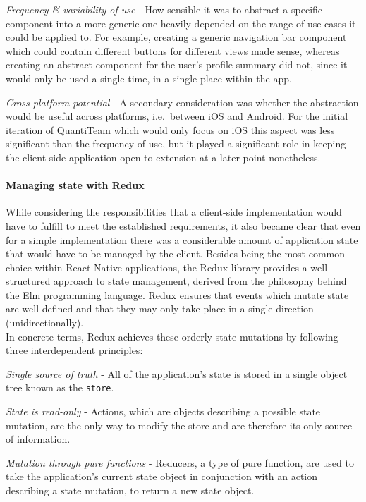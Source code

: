 \emph{Frequency \& variability of use} - How sensible it was to abstract
a specific component into a more generic one heavily depended on the
range of use cases it could be applied to. For example, creating a
generic navigation bar component which could contain different buttons
for different views made sense, whereas creating an abstract component
for the user's profile summary did not, since it would only be used a
single time, in a single place within the app.

\emph{Cross-platform potential} - A secondary consideration was whether
the abstraction would be useful across platforms, i.e.~between iOS and
Android. For the initial iteration of QuantiTeam which would only focus
on iOS this aspect was less significant than the frequency of use, but
it played a significant role in keeping the client-side application open
to extension at a later point nonetheless.

\paragraph{Managing state with Redux}\label{managing-state-with-redux}

While considering the responsibilities that a client-side implementation
would have to fulfill to meet the established requirements, it also
became clear that even for a simple implementation there was a
considerable amount of application state that would have to be managed
by the client. Besides being the most common choice within React Native
applications, the Redux library provides a well-structured approach to
state management, derived from the philosophy behind the Elm programming
language. Redux ensures that events which mutate state are well-defined
and that they may only take place in a single direction
(unidirectionally).\\
In concrete terms, Redux achieves these orderly state mutations by
following three interdependent
principles\cite{1redux}:

\emph{Single source of truth} - All of the application's state is stored
in a single object tree known as the \texttt{store}.

\emph{State is read-only} - Actions, which are objects describing a
possible state mutation, are the only way to modify the store and are
therefore its only source of information.

\emph{Mutation through pure functions} - Reducers, a type of pure
function, are used to take the application's current state object in
conjunction with an action describing a state mutation, to return a new
state object.

